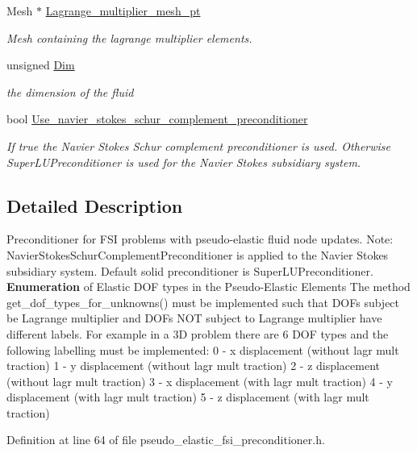\begin{DoxyCompactItemize}
Mesh $\ast$ \hyperlink{classoomph_1_1PseudoElasticFSIPreconditioner_a0a75413264015a10ce59e7a31c7fe7c4}{Lagrange\+\_\+multiplier\+\_\+mesh\+\_\+pt}
\begin{DoxyCompactList}\small\item\em Mesh containing the lagrange multiplier elements. \end{DoxyCompactList}\item 
unsigned \hyperlink{classoomph_1_1PseudoElasticFSIPreconditioner_aec1e28a3a746a76ed6a283115e8d3146}{Dim}
\begin{DoxyCompactList}\small\item\em the dimension of the fluid \end{DoxyCompactList}\item 
bool \hyperlink{classoomph_1_1PseudoElasticFSIPreconditioner_aa9eab77e9d4dfbdecfac9cccceb68c7b}{Use\+\_\+navier\+\_\+stokes\+\_\+schur\+\_\+complement\+\_\+preconditioner}
\begin{DoxyCompactList}\small\item\em If true the Navier Stokes Schur complement preconditioner is used. Otherwise Super\+L\+U\+Preconditioner is used for the Navier Stokes subsidiary system. \end{DoxyCompactList}\end{DoxyCompactItemize}


\subsection{Detailed Description}
Preconditioner for F\+SI problems with pseudo-\/elastic fluid node updates. Note\+: Navier\+Stokes\+Schur\+Complement\+Preconditioner is applied to the Navier Stokes subsidiary system. Default solid preconditioner is Super\+L\+U\+Preconditioner. {\bfseries Enumeration} of Elastic D\+OF types in the Pseudo-\/\+Elastic Elements The method get\+\_\+dof\+\_\+types\+\_\+for\+\_\+unknowns() must be implemented such that D\+O\+Fs subject be Lagrange multiplier and D\+O\+Fs N\+OT subject to Lagrange multiplier have different labels. For example in a 3D problem there are 6 D\+OF types and the following labelling must be implemented\+: 0 -\/ x displacement (without lagr mult traction) 1 -\/ y displacement (without lagr mult traction) 2 -\/ z displacement (without lagr mult traction) 3 -\/ x displacement (with lagr mult traction) 4 -\/ y displacement (with lagr mult traction) 5 -\/ z displacement (with lagr mult traction) 

Definition at line 64 of file pseudo\+\_\+elastic\+\_\+fsi\+\_\+preconditioner.\+h.



